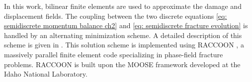 In this work, bilinear finite elements are used to approximate the damage and displacement fields. 
The coupling between the two discrete equations \ref{eq: semidiscrete momentum balance ch2} and \ref{eq: semidiscrete fracture evolution} is handled by an alternating minimization scheme. A detailed description of this scheme is given in \cite{hu2020phase}.  {\color{blue} This solution scheme is implemented using RACCOON \cite{raccoon}, a massively parallel finite element code specializing in phase-field fracture problems. RACCOON is built upon the MOOSE framework \cite{gaston2009moose, permann2020moose} developed at the Idaho National Laboratory.}

